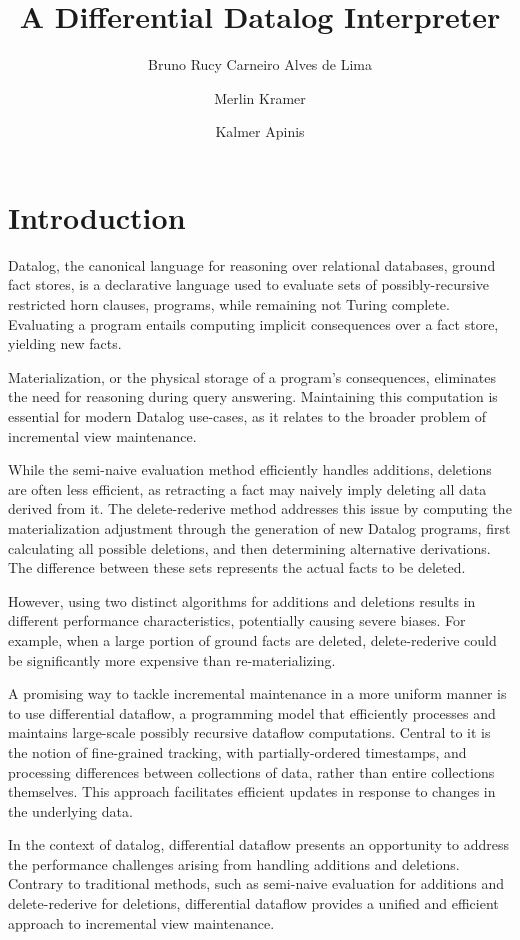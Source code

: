 \documentclass[sigconf,screen,review,natbib]{acmart}
\title{A Differential Datalog Interpreter}
\author{Bruno Rucy Carneiro Alves de Lima}
\affiliation{%
	\institution{University of Tartu}
	\department{Institute of Computer Science}
	\city{Tartu}
	\country{Estonia}
}
\author{Merlin Kramer}
\affiliation{%
	\institution{unaffiliated}
	\city{Wuppertal}
	\country{Germany}
}
\author{Kalmer Apinis}
\affiliation{%
	\institution{University of Tartu}
	\department{Institute of Computer Science}
	\city{Tartu}
	\country{Estonia}
}
\theoremstyle{definition}
\begin{document}
\maketitle

\section{Introduction}
Datalog\cite{datalog}, the canonical language for reasoning over relational databases, ground fact stores, is a
declarative language used to evaluate sets of possibly-recursive restricted horn clauses, programs, while
remaining not Turing complete. Evaluating a program entails computing implicit consequences over a fact
store, yielding new facts.

Materialization, or the physical storage of a program's consequences, eliminates the need for reasoning
during query answering. Maintaining this computation is essential for modern Datalog use-cases, as it
relates to the broader problem of incremental view maintenance.

While the semi-naive evaluation method\cite{datalog} efficiently handles additions, deletions are often less efficient, as
retracting a fact may naively imply deleting all data derived from it. The delete-rederive\cite{dred} method addresses
this issue by computing the materialization adjustment through the generation of new Datalog programs, first
calculating all possible deletions, and then determining alternative derivations. The difference between these
sets represents the actual facts to be deleted.

However, using two distinct algorithms for additions and deletions results in different performance characteristics,
potentially causing severe biases. For example, when a large portion of ground facts are deleted, delete-rederive
could be significantly more expensive than re-materializing.

A promising way to tackle incremental maintenance in a more uniform manner is to use differential dataflow, a
programming model that efficiently processes and maintains large-scale possibly recursive dataflow computations. Central
to it is the notion of fine-grained tracking, with partially-ordered timestamps, and processing differences between
collections of data, rather than entire collections themselves. This approach facilitates efficient updates in response
to changes in the underlying data\cite{differential_dataflow}.

In the context of datalog, differential dataflow presents an opportunity to address the performance challenges
arising from handling additions and deletions. Contrary to traditional methods, such as semi-naive evaluation for
additions and delete-rederive for deletions, differential dataflow provides a unified and efficient approach to
incremental view maintenance.
\end{document}
